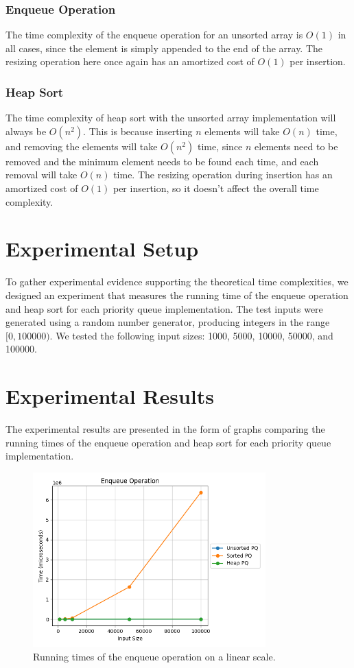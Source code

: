 \documentclass{article}
\begin{document}
\subsubsection{Enqueue Operation}
The time complexity of the enqueue operation for an unsorted array is $O(1)$ in all cases, since the element is simply appended to the end of the array. 
The resizing operation here once again has an amortized cost of $O(1)$ per insertion.

\subsubsection{Heap Sort}
The time complexity of heap sort with the unsorted array implementation will always be $O(n^2)$. 
This is because inserting $n$ elements will take $O(n)$ time, and removing the elements will take $O(n^2)$ time, since $n$ elements need to be removed and the minimum element needs to be found each time, and each removal will take $O(n)$ time. 
The resizing operation during insertion has an amortized cost of $O(1)$ per insertion, so it doesn't affect the overall time complexity.

\section{Experimental Setup}
To gather experimental evidence supporting the theoretical time complexities, we designed an experiment that measures the running time of the enqueue operation and heap sort for each priority queue implementation. 
The test inputs were generated using a random number generator, producing integers in the range $[0, 100000)$. 
We tested the following input sizes: 1000, 5000, 10000, 50000, and 100000. 

\section{Experimental Results}
The experimental results are presented in the form of graphs comparing the running times of the enqueue operation and heap sort for each priority queue implementation.

\begin{figure}[H]
    \centering
    \includegraphics[width=0.8\textwidth]{../plots/enqueue_linear.png}
    \caption{Running times of the enqueue operation on a linear scale.}
\end{figure}
\end{document}
